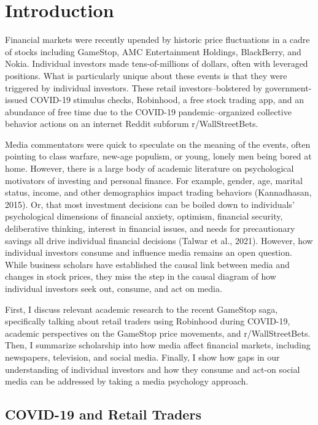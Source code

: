 \documentclass[12pt,]{article}
\begin{document}
\hypertarget{introduction}{%
\section{Introduction}\label{introduction}}

Financial markets were recently upended by historic price fluctuations
in a cadre of stocks including GameStop, AMC Entertainment Holdings,
BlackBerry, and Nokia. Individual investors made tens-of-millions of
dollars, often with leveraged positions. What is particularly unique
about these events is that they were triggered by individual investors.
These retail investors--bolstered by government-issued COVID-19 stimulus
checks, Robinhood, a free stock trading app, and an abundance of free
time due to the COVID-19 pandemic--organized collective behavior actions
on an internet Reddit subforum r/WallStreetBets.

Media commentators were quick to speculate on the meaning of the events,
often pointing to class warfare, new-age populism, or young, lonely men
being bored at home. However, there is a large body of academic
literature on psychological motivators of investing and personal
finance. For example, gender, age, marital status, income, and other
demographics impact trading behaviors (Kannadhasan, 2015). Or, that most
investment decisions can be boiled down to individuals' psychological
dimensions of financial anxiety, optimism, financial security,
deliberative thinking, interest in financial issues, and needs for
precautionary savings all drive individual financial decisions (Talwar
et al., 2021). However, how individual investors consume and influence
media remains an open question. While business scholars have established
the causal link between media and changes in stock prices, they miss the
step in the causal diagram of how individual investors seek out,
consume, and act on media.

First, I discuss relevant academic research to the recent GameStop saga,
specifically talking about retail traders using Robinhood during
COVID-19, academic perspectives on the GameStop price movements, and
r/WallStreetBets. Then, I summarize scholarship into how media affect
financial markets, including newspapers, television, and social media.
Finally, I show how gaps in our understanding of individual investors
and how they consume and act-on social media can be addressed by taking
a media psychology approach.

\hypertarget{covid-19-and-retail-traders}{%
\subsection{COVID-19 and Retail
Traders}\label{covid-19-and-retail-traders}}
\end{document}
